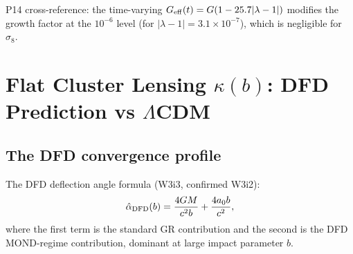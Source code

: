 \documentclass[11pt]{article}
\newcommand{\ee}[1]{\times 10^{#1}}
\newcommand{\lambdaone}{|\lambda-1|}
\newcommand{\azero}{a_0}
\newcommand{\DFD}{{\rm DFD}}
\begin{document}
P14 cross-reference: the time-varying $G_{\rm eff}(t) = G(1-25.7\lambdaone)$
modifies the growth factor at the $10^{-6}$ level (for $\lambdaone =
3.1\ee{-7}$), which is negligible for $\sigma_8$.

\section{Flat Cluster Lensing $\kappa(b)$: DFD Prediction vs $\Lambda$CDM}
\label{sec:kappa-cluster}

\subsection{The DFD convergence profile}

The DFD deflection angle formula (W3i3, confirmed W3i2):
\begin{equation}\label{eq:deflection-dfd}
  \hat\alpha_{\DFD}(b) = \frac{4GM}{c^2 b} + \frac{4\azero b}{c^2},
\end{equation}
where the first term is the standard GR contribution and the second
is the DFD MOND-regime contribution, dominant at large impact parameter $b$.
\end{document}
